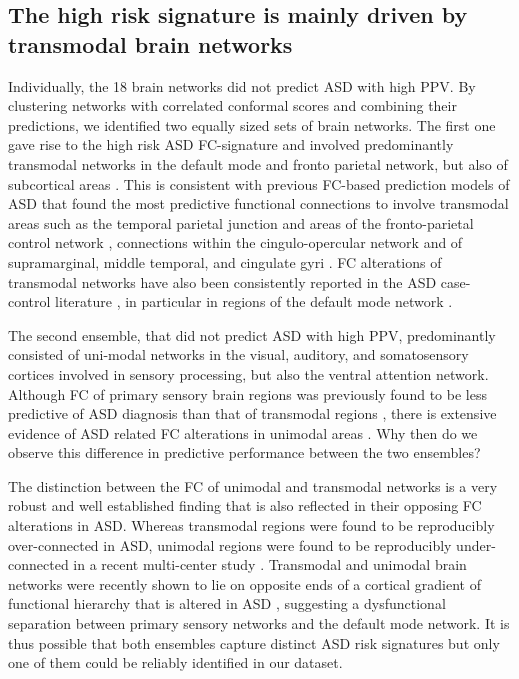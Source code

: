 \documentclass[9pt,lineno]{elife}
\begin{document}
\subsection{The high risk signature is mainly driven by transmodal brain networks}
Individually, the 18 brain networks did not predict ASD with high PPV. By clustering networks with correlated conformal scores and combining their predictions, we identified two equally sized sets of brain networks. The first one gave rise to the high risk ASD FC-signature and involved predominantly transmodal networks in the default mode and fronto parietal network, but also of subcortical areas \citep{Alves2019-ks}. This is consistent with previous FC-based prediction models of ASD that found the most predictive functional connections to involve transmodal areas such as the temporal parietal junction and areas of the fronto-parietal control network \citep{Abraham2017-vf}, connections within the cingulo-opercular network \citep{Yahata2016-jk} and of supramarginal, middle temporal, and cingulate gyri \citep{Heinsfeld2018-yl}. FC alterations of transmodal networks have also been consistently reported in the ASD case-control literature \citep{Monk2009-go,Holiga2019-ub,Just2007-ho}, in particular in regions of the default mode network \citep{Washington2014-nx,Assaf2010-jx}.

The second ensemble, that did not predict ASD with high PPV, predominantly consisted of uni-modal networks in the visual, auditory, and somatosensory cortices involved in sensory processing, but also the ventral attention network. Although FC of primary sensory brain regions was previously found to be less predictive of ASD diagnosis than that of transmodal regions \citep{Heinsfeld2018-yl}, there is extensive evidence of ASD related FC alterations in unimodal areas \citep{Oldehinkel2019-ra}. Why then do we observe this difference in predictive performance between the two ensembles?

The distinction between the FC of unimodal and transmodal networks is a very robust and well established finding \citep{Raichle2001-et,Fox2005-ay,Buckner2019-vs} that is also reflected in their opposing FC alterations in ASD. Whereas transmodal regions were found to be reproducibly over-connected in ASD, unimodal regions were found to be reproducibly under-connected in a recent multi-center study \citep{Holiga2019-ub}. Transmodal and unimodal brain networks were recently shown to lie on opposite ends of a cortical gradient of functional hierarchy \citep{Margulies2016-rd} that is altered in ASD \citep{Hong2019-hp}, suggesting a dysfunctional separation between primary sensory networks and the default mode network. It is thus possible that both ensembles capture distinct ASD risk signatures but only one of them could be reliably identified in our dataset. 
\end{document}
